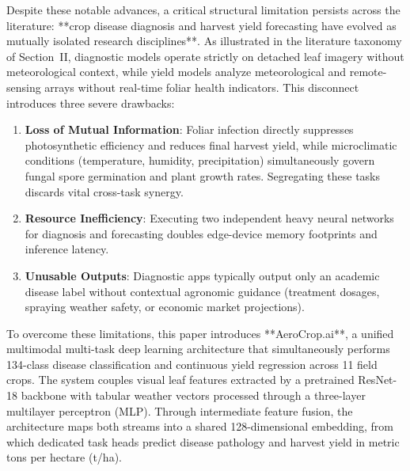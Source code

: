 \documentclass[conference]{IEEEtran}
\begin{document}
Despite these notable advances, a critical structural limitation persists across the literature: **crop disease diagnosis and harvest yield forecasting have evolved as mutually isolated research disciplines**. As illustrated in the literature taxonomy of Section~II, diagnostic models operate strictly on detached leaf imagery without meteorological context, while yield models analyze meteorological and remote-sensing arrays without real-time foliar health indicators. This disconnect introduces three severe drawbacks:
\begin{enumerate}
    \item \textbf{Loss of Mutual Information}: Foliar infection directly suppresses photosynthetic efficiency and reduces final harvest yield, while microclimatic conditions (temperature, humidity, precipitation) simultaneously govern fungal spore germination and plant growth rates. Segregating these tasks discards vital cross-task synergy.
    \item \textbf{Resource Inefficiency}: Executing two independent heavy neural networks for diagnosis and forecasting doubles edge-device memory footprints and inference latency.
    \item \textbf{Unusable Outputs}: Diagnostic apps typically output only an academic disease label without contextual agronomic guidance (treatment dosages, spraying weather safety, or economic market projections).
\end{enumerate}

To overcome these limitations, this paper introduces **AeroCrop.ai**, a unified multimodal multi-task deep learning architecture that simultaneously performs 134-class disease classification and continuous yield regression across 11 field crops. The system couples visual leaf features extracted by a pretrained ResNet-18 backbone with tabular weather vectors processed through a three-layer multilayer perceptron (MLP). Through intermediate feature fusion, the architecture maps both streams into a shared 128-dimensional embedding, from which dedicated task heads predict disease pathology and harvest yield in metric tons per hectare (t/ha).
\end{document}
